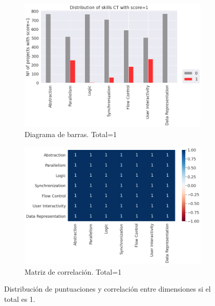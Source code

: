 \documentclass[a4paper, 12pt]{book}
\begin{document}
\begin{figure}[H]
    \centering
    \begin{subfigure}[h]{.49\textwidth} 
        \includegraphics[width=\textwidth]{img/distribucion_1_Scratch}
        \caption{Diagrama de barras. Total=1}
        \label{fig:total1}
    \end{subfigure}       
    \begin{subfigure}[h]{.49\textwidth} 
        \includegraphics[width=\textwidth]{img/corr_1_Scratch}
        \caption{Matriz de correlación. Total=1}
        \label{fig:corr1}
    \end{subfigure}
     \caption{Distribución de puntuaciones y correlación entre dimensiones si el total es 1.}
\end{figure}
\end{document}
